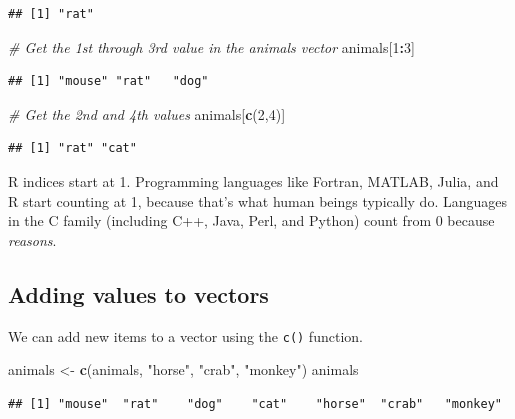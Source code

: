 \documentclass[
]{book}
\newenvironment{Shaded}{\begin{snugshade}}{\end{snugshade}}
\newcommand{\CommentTok}[1]{\textcolor[rgb]{0.56,0.35,0.01}{\textit{#1}}}
\newcommand{\DecValTok}[1]{\textcolor[rgb]{0.00,0.00,0.81}{#1}}
\newcommand{\FunctionTok}[1]{\textcolor[rgb]{0.13,0.29,0.53}{\textbf{#1}}}
\newcommand{\NormalTok}[1]{#1}
\newcommand{\OtherTok}[1]{\textcolor[rgb]{0.56,0.35,0.01}{#1}}
\newcommand{\SpecialCharTok}[1]{\textcolor[rgb]{0.81,0.36,0.00}{\textbf{#1}}}
\newcommand{\StringTok}[1]{\textcolor[rgb]{0.31,0.60,0.02}{#1}}
\begin{document}
\begin{verbatim}
## [1] "rat"
\end{verbatim}

\begin{Shaded}
\begin{Highlighting}[]
\CommentTok{\# Get the 1st through 3rd value in the animals vector}
\NormalTok{animals[}\DecValTok{1}\SpecialCharTok{:}\DecValTok{3}\NormalTok{]}
\end{Highlighting}
\end{Shaded}

\begin{verbatim}
## [1] "mouse" "rat"   "dog"
\end{verbatim}

\begin{Shaded}
\begin{Highlighting}[]
\CommentTok{\# Get the 2nd and 4th values}
\NormalTok{animals[}\FunctionTok{c}\NormalTok{(}\DecValTok{2}\NormalTok{,}\DecValTok{4}\NormalTok{)]}
\end{Highlighting}
\end{Shaded}

\begin{verbatim}
## [1] "rat" "cat"
\end{verbatim}

R indices start at 1. Programming languages like Fortran, MATLAB, Julia, and R start counting at 1, because that's what human beings typically do. Languages in the C family (including C++, Java, Perl, and Python) count from 0 because \emph{reasons}.

\subsection*{Adding values to vectors}\label{adding-values-to-vectors}

We can add new items to a vector using the \texttt{c()} function.

\begin{Shaded}
\begin{Highlighting}[]
\NormalTok{animals }\OtherTok{\textless{}{-}} \FunctionTok{c}\NormalTok{(animals, }\StringTok{"horse"}\NormalTok{, }\StringTok{"crab"}\NormalTok{, }\StringTok{"monkey"}\NormalTok{)}
\NormalTok{animals}
\end{Highlighting}
\end{Shaded}

\begin{verbatim}
## [1] "mouse"  "rat"    "dog"    "cat"    "horse"  "crab"   "monkey"
\end{verbatim}
\end{document}
